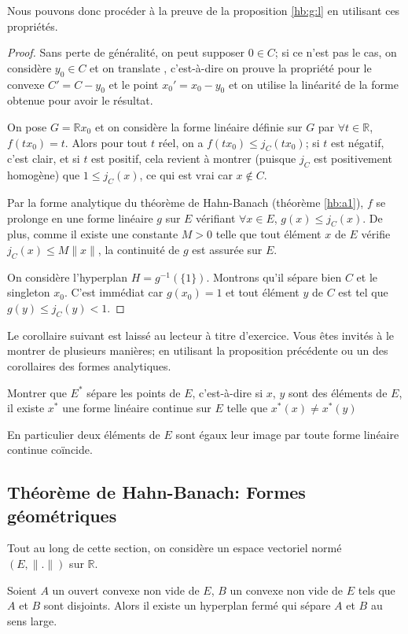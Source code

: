 Nous pouvons donc procéder à la preuve de la proposition \ref{hb:g:l}
en utilisant ces propriétés.

\begin{proof}
Sans perte de généralité, on peut supposer $0\in C$; si ce n'est pas le cas,
on considère $y_0\in C$ et \og on translate \fg, c'est-à-dire on prouve la
propriété pour le convexe $C' = C - y_0$ et le point $x_0' = x_0 - y_0$ et on utilise
la linéarité de la forme obtenue pour avoir le résultat.

On pose $G = \mathbb{R}x_0$ et on considère la forme linéaire définie sur $G$
par $\forall t\in \mathbb{R}$, $f(tx_0) = t$. Alors pour tout $t$ réel, on a
$f(tx_0)\leq j_C(tx_0)$; si $t$ est négatif, c'est clair, et si $t$ est positif,
cela revient à montrer (puisque $j_C$ est positivement homogène)
que $1\leq j_C(x)$, ce qui est vrai car $x\notin C$.

Par la forme analytique du théorème de Hahn-Banach (théorème \ref{hb:a1}),
$f$ se prolonge en une forme linéaire $g$ sur $E$ vérifiant $\forall x \in E$,
$g(x)\leq j_C(x)$.
De plus, comme il existe une constante $M >0$ telle que tout élément
$x$ de $E$ vérifie $j_C(x) \leq M\|x\|$, la continuité de $g$ est assurée
sur $E$.

On considère l'hyperplan $H = g^{-1}(\{1\})$. Montrons qu'il sépare bien $C$ et
le singleton $x_0$. C'est immédiat car $g(x_0) = 1$ et tout élément $y$ de $C$
est tel que $g(y)\leq j_C(y) < 1$.
\end{proof}

Le corollaire suivant est laissé au lecteur à titre d'exercice. Vous êtes
invités à le montrer de plusieurs manières; en utilisant la proposition
précédente ou un des corollaires des formes analytiques.

\begin{exo}
  Montrer que $E^*$ sépare les points de $E$, c'est-à-dire si $x$, $y$
  sont des éléments de $E$, il existe $x^*$ une forme linéaire continue
  sur $E$ telle que $x^*(x)\neq x^*(y)$
\end{exo}

En particulier deux éléments de $E$ sont égaux \ssi{} leur image
par toute forme linéaire continue coïncide.

\subsection{Théorème de Hahn-Banach: Formes géométriques}
Tout au long de cette section, on considère un espace vectoriel normé
$(E, \|.\|)$ sur $\mathbb{R}$.
\begin{thm} \label{hb:g1}
  Soient $A$ un ouvert convexe non vide de $E$, $B$ un convexe non vide
  de $E$ tels que $A$ et $B$ sont disjoints. Alors il existe un hyperplan
  fermé qui sépare $A$ et $B$ au sens large.
\end{thm}

